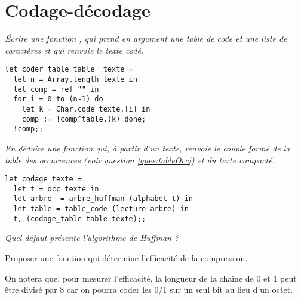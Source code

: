 \section{Codage-décodage}
\begin{Exercise}[title = Codage avec table]\it 
Écrire une fonction , qui prend en argument une table de
code et une liste de caractères et qui renvoie le texte codé. 
\end{Exercise}
\begin{Answer}
\begin{lstlisting}
let coder_table table  texte =
  let n = Array.length texte in
  let comp = ref "" in
  for i = 0 to (n-1) do 
    let k = Char.code texte.[i] in
    comp := !comp^table.(k) done;
  !comp;;
\end{lstlisting}
\end{Answer}
\begin{Exercise}[title = Codage du texte]\it 
En déduire une fonction qui, à partir d'un texte, renvoie le couple formé de la table des occurrences (voir question \ref{ques:tableOcc}) et du texte compacté.
\end{Exercise}
\begin{Answer}
\begin{lstlisting}
let codage texte =
  let t = occ texte in
  let arbre  = arbre_huffman (alphabet t) in
  let table = table_code (lecture arbre) in
  t, (codage_table table texte);;
\end{lstlisting}
\end{Answer}
\begin{Exercise}[title = Analyse]\it 
Quel défaut présente l'algorithme de Huffman ?

Proposer une fonction qui détermine l'efficacité de la compression. 

On notera que, pour mesurer l'efficacité, la longueur de la chaîne de 0 et 1 peut être divisé par 8 car on pourra coder les 0/1 sur un seul bit au lieu d'un octet. 
\end{Exercise}

